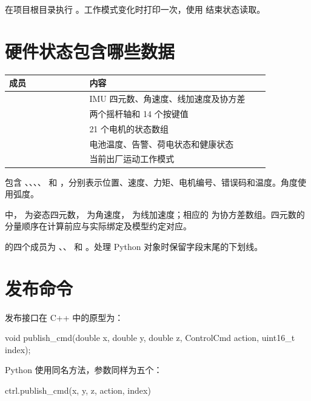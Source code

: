 在项目根目录执行 。工作模式变化时打印一次，使用  结束状态读取。
\section{硬件状态包含哪些数据}

\begingroup\small\renewcommand{\arraystretch}{1.15}
\begin{longtable}{@{}P{0.28\linewidth}P{0.63\linewidth}@{}}
\toprule
\textbf{成员} & \textbf{内容} \\
\midrule\endhead
{} & IMU 四元数、角速度、线加速度及协方差 \\
 & 两个摇杆轴和 14 个按键值 \\
 & 21 个电机的状态数组 \\
 & 电池温度、告警、荷电状态和健康状态 \\
 & 当前出厂运动工作模式 \\
\bottomrule\end{longtable}\endgroup

 包含 、、、、 和 ，分别表示位置、速度、力矩、电机编号、错误码和温度。角度使用弧度。

 中， 为姿态四元数， 为角速度， 为线加速度；相应的  为协方差数组。四元数的分量顺序在计算前应与实际绑定及模型约定对应。

 的四个成员为 、、 和 。处理 Python 对象时保留字段末尾的下划线。
\section{发布命令}
发布接口在 C++ 中的原型为：
\par\noindent\begin{minipage}{\linewidth}
\begin{command}
void publish_cmd(double x, double y, double z,
                 ControlCmd action, uint16_t index);
\end{command}
\end{minipage}\par

Python 使用同名方法，参数同样为五个：
\par\noindent\begin{minipage}{\linewidth}
\begin{command}
ctrl.publish_cmd(x, y, z, action, index)
\end{command}
\end{minipage}\par


